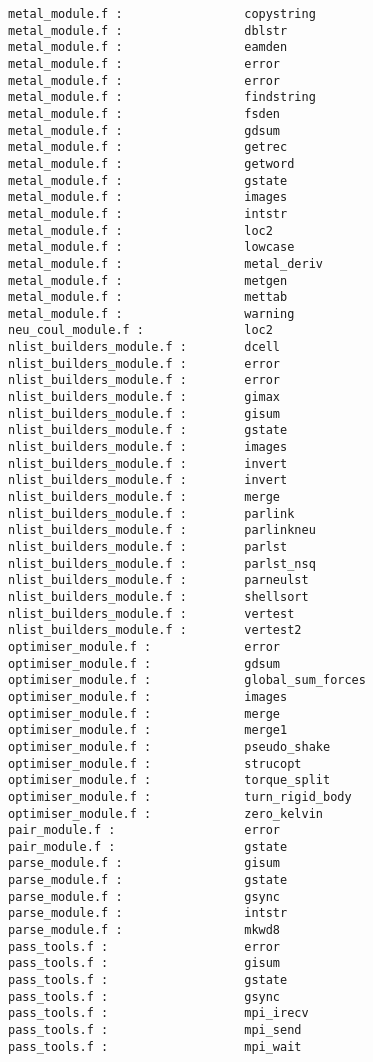 \begin{verbatim}
metal_module.f :                 copystring 
metal_module.f :                 dblstr
metal_module.f :                 eamden 
metal_module.f :                 error 
metal_module.f :                 error 
metal_module.f :                 findstring
metal_module.f :                 fsden 
metal_module.f :                 gdsum 
metal_module.f :                 getrec 
metal_module.f :                 getword 
metal_module.f :                 gstate 
metal_module.f :                 images 
metal_module.f :                 intstr
metal_module.f :                 loc2
metal_module.f :                 lowcase 
metal_module.f :                 metal_deriv 
metal_module.f :                 metgen 
metal_module.f :                 mettab 
metal_module.f :                 warning 
neu_coul_module.f :              loc2
nlist_builders_module.f :        dcell 
nlist_builders_module.f :        error 
nlist_builders_module.f :        error 
nlist_builders_module.f :        gimax 
nlist_builders_module.f :        gisum 
nlist_builders_module.f :        gstate 
nlist_builders_module.f :        images 
nlist_builders_module.f :        invert 
nlist_builders_module.f :        invert 
nlist_builders_module.f :        merge 
nlist_builders_module.f :        parlink 
nlist_builders_module.f :        parlinkneu 
nlist_builders_module.f :        parlst 
nlist_builders_module.f :        parlst_nsq 
nlist_builders_module.f :        parneulst 
nlist_builders_module.f :        shellsort 
nlist_builders_module.f :        vertest 
nlist_builders_module.f :        vertest2 
optimiser_module.f :             error 
optimiser_module.f :             gdsum 
optimiser_module.f :             global_sum_forces 
optimiser_module.f :             images 
optimiser_module.f :             merge 
optimiser_module.f :             merge1 
optimiser_module.f :             pseudo_shake 
optimiser_module.f :             strucopt 
optimiser_module.f :             torque_split 
optimiser_module.f :             turn_rigid_body 
optimiser_module.f :             zero_kelvin 
pair_module.f :                  error 
pair_module.f :                  gstate 
parse_module.f :                 gisum 
parse_module.f :                 gstate 
parse_module.f :                 gsync 
parse_module.f :                 intstr
parse_module.f :                 mkwd8
pass_tools.f :                   error 
pass_tools.f :                   gisum 
pass_tools.f :                   gstate 
pass_tools.f :                   gsync 
pass_tools.f :                   mpi_irecv 
pass_tools.f :                   mpi_send 
pass_tools.f :                   mpi_wait 

\end{verbatim}
